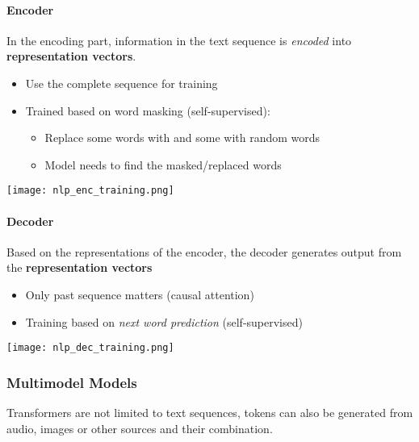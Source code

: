 \paragraph{Encoder}
In the encoding part, information in the text sequence is \textit{encoded} into \textbf{representation vectors}.
\newpar{}
\begin{itemize}
    \item Use the complete sequence for training
    \item Trained based on word masking (self-supervised):
    \begin{itemize}
        \item Replace some words with  and some with random words
        \item Model needs to find the masked/replaced words
    \end{itemize}
\end{itemize}
\begin{center}
    \texttt{[image: nlp\_enc\_training.png]}
\end{center}


\paragraph{Decoder}

Based on the representations of the encoder, the decoder generates output from the \textbf{representation vectors}
\newpar{}
\begin{itemize}
    \item Only past sequence matters (causal attention)
    \item Training based on \textit{next word prediction} (self-supervised)
\end{itemize}
\begin{center}
    \texttt{[image: nlp\_dec\_training.png]}
\end{center}

\subsubsection{Multimodel Models}
Transformers are not limited to text sequences, tokens can also be generated from audio, images or other sources and their combination.
